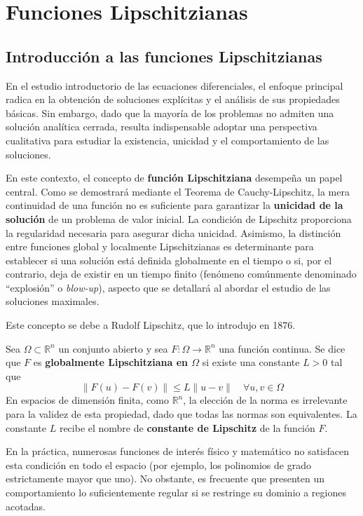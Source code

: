 \section{Funciones Lipschitzianas}

\subsection{Introducción a las funciones Lipschitzianas}
En el estudio introductorio de las ecuaciones diferenciales, el enfoque principal radica en la obtención de soluciones explícitas y el análisis de sus propiedades básicas. Sin embargo, dado que la mayoría de los problemas no admiten una solución analítica cerrada, resulta indispensable adoptar una perspectiva cualitativa para estudiar la existencia, unicidad y el comportamiento de las soluciones.

En este contexto, el concepto de \textbf{función Lipschitziana} desempeña un papel central. Como se demostrará mediante el Teorema de Cauchy-Lipschitz, la mera continuidad de una función no es suficiente para garantizar la \textbf{unicidad de la solución} de un problema de valor inicial. La condición de Lipschitz proporciona la regularidad necesaria para asegurar dicha unicidad. Asimismo, la distinción entre funciones global y localmente Lipschitzianas es determinante para establecer si una solución está definida globalmente en el tiempo o si, por el contrario, deja de existir en un tiempo finito (fenómeno comúnmente denominado ``explosión'' o \textit{blow-up}), aspecto que se detallará al abordar el estudio de las soluciones maximales.

Este concepto se debe a Rudolf Lipschitz, que lo introdujo en 1876.

\begin{definición}
    Sea $\Omega \subset \mathbb{R}^n$ un conjunto abierto y sea $F : \Omega \to \mathbb{R}^n$ una función continua. Se dice que $F$ es \textbf{globalmente Lipschitziana en $\Omega$} si existe una constante $L > 0$ tal que
    \[
        \| F(u) - F(v) \| \leq L \| u - v \| \quad \forall u, v \in \Omega
    \]
    En espacios de dimensión finita, como $\mathbb{R}^n$, la elección de la norma es irrelevante para la validez de esta propiedad, dado que todas las normas son equivalentes. La constante $L$ recibe el nombre de \textbf{constante de Lipschitz} de la función $F$.
\end{definición}

En la práctica, numerosas funciones de interés físico y matemático no satisfacen esta condición en todo el espacio (por ejemplo, los polinomios de grado estrictamente mayor que uno). No obstante, es frecuente que presenten un comportamiento lo suficientemente regular si se restringe su dominio a regiones acotadas.


